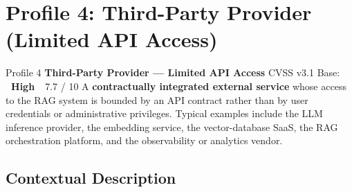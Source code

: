 \documentclass[12pt, a4paper]{report}
\newcommand{\badgehigh}{\colorbox{warn}{\color{white}\small\textbf{~High~}}}
\begin{document}
\newpage
\section{Profile 4: Third-Party Provider (Limited API Access)}

\begin{profilebanner}%
  {Profile 4 \enspace\textbf{Third-Party Provider --- Limited API Access}}%
  {CVSS v3.1 Base: \badgehigh\ 7.7 / 10}
  \small
  A \textbf{contractually integrated external service} whose access to the
  RAG system is bounded by an API contract rather than by user credentials
  or administrative privileges. Typical examples include the LLM inference
  provider, the embedding service, the vector-database SaaS, the RAG
  orchestration platform, and the observability or analytics vendor.
\end{profilebanner}

\subsection{Contextual Description}
\end{document}
